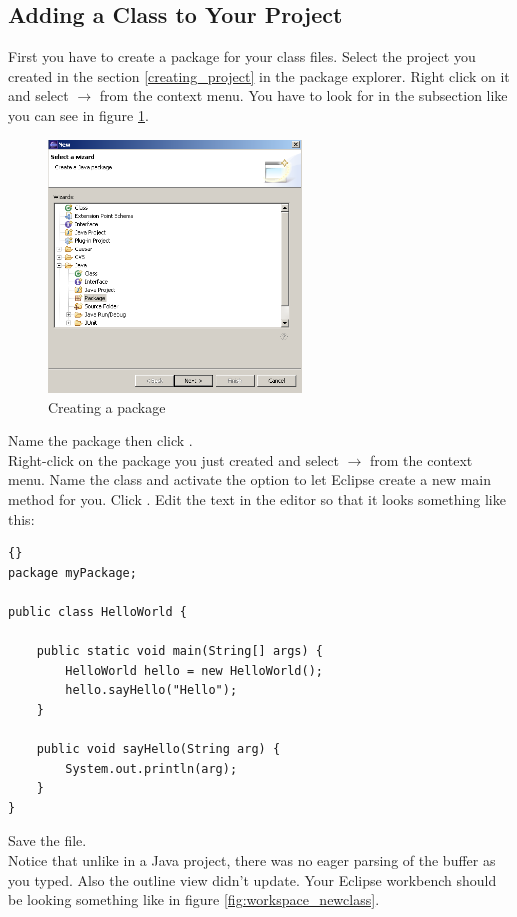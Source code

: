 \subsection{Adding a Class to Your Project}
First you have to create a package for your class files. Select the project you created in the section \ref{creating_project} in the package explorer. Right click on it and select  $\rightarrow$  from the context menu. You have to look for  in the  subsection like you can see in figure \ref{fig:package}.

\begin{figure}[htbp]
	\centering
		\includegraphics[width=0.60\textwidth]{images/package.png}
	\caption{Creating a package}
	\label{fig:package}
\end{figure}

Name the package  then click .\\
Right-click on the package you just created and select  $\rightarrow$  from the context menu. Name the class  and activate the option to let Eclipse create a new main method for you. Click .
Edit the text in the editor so that it looks something like this:
	\begin{lstlisting}[basicstyle=\small\it,caption=HelloWorld.java,label=lst:HelloWorld,name=listing:helloworld,frame=none]{}
package myPackage;

public class HelloWorld {

	public static void main(String[] args) {
		HelloWorld hello = new HelloWorld();
		hello.sayHello("Hello");
	}

	public void sayHello(String arg) {
		System.out.println(arg);
	}
}
\end{lstlisting}
Save the file.\\
Notice that unlike in a Java project, there was no eager parsing of the buffer as you typed. Also the outline view didn't update. Your Eclipse workbench should be looking something like in figure \ref{fig:workspace_newclass}.\\

